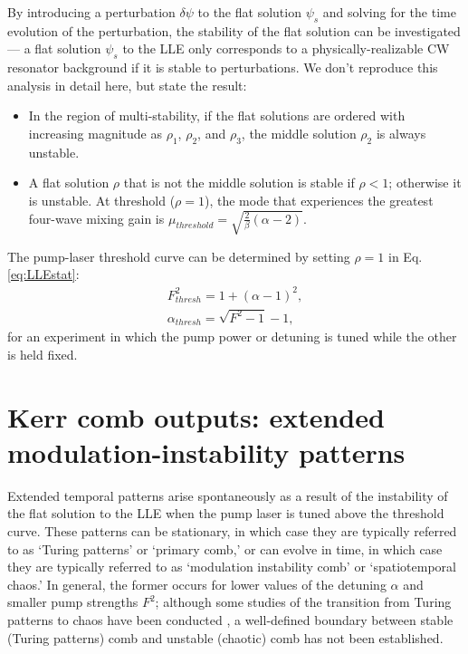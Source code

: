 By introducing a perturbation $\delta\psi$ to the flat solution $\psi_s$ and solving for the time evolution of the perturbation, the stability of the flat solution can be investigated --- a flat solution $\psi_s$ to the LLE only corresponds to a physically-realizable CW resonator background if it is stable to perturbations. We don't reproduce this analysis in detail here, but state the result:
\begin{itemize}
	\item In the region of multi-stability, if the flat solutions are ordered with increasing magnitude as $\rho_1$, $\rho_2$, and $\rho_3$, the middle solution $\rho_2$ is always unstable. 
	\item A flat solution $\rho$ that is not the middle solution is stable if $\rho<1$; otherwise it is unstable. At threshold ($\rho=1$), the mode that experiences the greatest four-wave mixing gain is $\mu_{threshold}=\sqrt{\frac{2}{\beta}(\alpha-2)}$.
\end{itemize}

The pump-laser threshold curve can be determined by setting $\rho=1$ in Eq. \ref{eq:LLEstat}: 
\begin{align}
F^2_{thresh}=1+(\alpha-1)^2, \\
\alpha_{thresh}=\sqrt{F^2-1}-1,
\end{align} 
for an experiment in which the pump power or detuning is tuned while the other is held fixed. 


\section{Kerr comb outputs: extended modulation-instability patterns}

Extended temporal patterns arise spontaneously as a result of the instability of the flat solution to the LLE when the pump laser is tuned above the threshold curve. These patterns can be stationary, in which case they are typically referred to as `Turing patterns' or `primary comb,' or can evolve in time, in which case they are typically referred to as `modulation instability comb' or `spatiotemporal chaos.' In general, the former occurs for lower values of the detuning $\alpha$ and smaller pump strengths $F^2$; although some studies of the transition from Turing patterns to chaos have been conducted \cite{Coillet2015,others}, a well-defined boundary between stable (Turing patterns) comb and unstable (chaotic) comb has not been established. 

